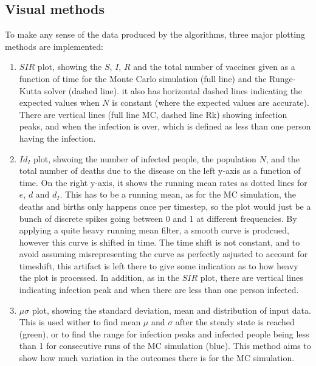 \subsection{Visual methods}
To make any sense of the data produced by the algorithms, three major plotting methods are implemented:
\begin{enumerate}
    \item $SIR$ plot, showing the $S$, $I$, $R$ and the total number of vaccines given as a function of time for the Monte Carlo simulation (full line) and the Runge-Kutta solver (dashed line).
            it also has horizontal dashed lines indicating the expected values when $N$ is constant (where the expected values are accurate).
            There are vertical lines (full line MC, dashed line Rk) showing infection peaks, and when the infection is over, which is defined as less than one person having the infection.
    \item $Id_I$ plot, shwoing the number of infected people, the population $N$, and the total number of deaths due to the disease on the left y-axis as a function of time. 
            On the right y-axis, it shows the running mean rates as dotted lines for $e$, $d$ and $d_I$. This has to be a running mean, as for the MC simulation, the deaths and births only happens once per timestep,
             so the plot would just be a bunch of discrete spikes going between 0 and 1 at different frequencies. By applying a quite heavy running mean filter, a smooth curve is prodcued, however this curve is shifted in time.
            The time shift is not constant, and to avoid assuming misrepresenting the curve as perfectly asjusted to account for timeshift, this artifact is left there to give some indication as to how heavy the plot is processed.
            In addition, as in the $SIR$ plot, there are vertical lines indicating infection peak and when there are less than one person infected.
    \item $\mu \sigma$ plot, showing the standard deviation, mean and distribution of input data. 
            This is used wither to find mean $\mu$ and $\sigma$ after the steady state is reached (green), or
             to find the range for infection peaks and infected people being less than 1 for consecutive runs of the MC simulation (blue).
             This method aims to show how much variation in the outcomes there is for the MC simulation.
\end{enumerate}

